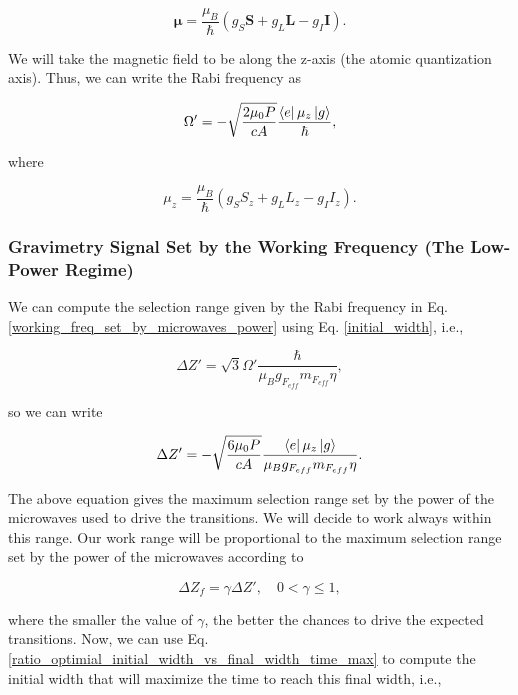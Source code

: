 \documentclass{article}
\begin{document}
\begin{equation}
     \boldsymbol{\mu} = \frac{\mu_{B}}{\hbar}(g_{S}\boldsymbol{S} + g_{L}\boldsymbol{L} - g_{I}\boldsymbol{I}).
\end{equation}

We will take the magnetic field to be along the z-axis (the atomic quantization axis). Thus, we can write the Rabi frequency as

\begin{equation}\label{working_freq_set_by_microwaves_power}
\Omega' = - \sqrt{\frac{2 \mu_{0} P}{c A}} \frac{\bra{e} \mu_{z} \ket{g}}{\hbar},
\end{equation}

where 

\begin{equation}
     \mu_{z} = \frac{\mu_{B}}{\hbar}(g_{S}S_{z} + g_{L}L_{z} - g_{I}I_{z}).
\end{equation}

\subsubsection{Gravimetry Signal Set by the Working Frequency (The Low-Power Regime)}
We can compute the selection range given by the Rabi frequency in Eq. \ref{working_freq_set_by_microwaves_power} using Eq. \ref{initial_width}, i.e.,

\begin{equation*}
\Delta Z' = \sqrt{3} \Omega' \frac{\hbar}{\mu_{B} g_{F_{eff}} m_{F_{eff}} \eta},
\end{equation*}

so we can write

\begin{equation}\label{maximum_selection_range}
\Delta Z' = - \sqrt{\frac{6 \mu_{0} P}{c A}} \frac{\bra{e} \mu_{z} \ket{g}}{\mu_{B} g_{F_{eff}} m_{F_{eff}} \eta}.
\end{equation}

The above equation gives the maximum selection range set by the power of the microwaves used to drive the transitions. We will decide to work always within this range. Our work range will be proportional to the maximum selection range set by the power of the microwaves according to

\begin{equation}\label{warning_range}
    \Delta Z_{f} = \gamma \Delta Z' \mathrm{,} \quad 0 < \gamma \leq 1,
\end{equation}

where the smaller the value of $\gamma$, the better the chances to drive the expected transitions. Now, we can use Eq. \ref{ratio_optimial_initial_width_vs_final_width_time_max} to compute the initial width that will maximize the time to reach this final width, i.e.,
\end{document}
